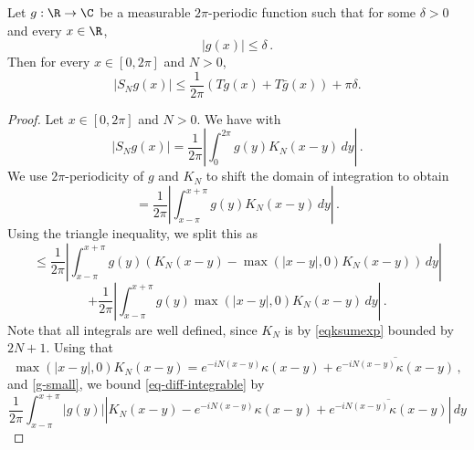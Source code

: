 \begin{lemma}
    \label{partial-Fourier-sum-bound}
    \leanok
    Let $g:\R\to\C$ be a measurable $2\pi$-periodic function such that for some $\delta>0$ and every $x\in\R$,
    \begin{equation}
        |g(x)|\le \delta \,.
    \end{equation}
    Then for every $x\in [0,2\pi]$ and $N>0$,
    \begin{equation*}
        |S_N g(x)| \le \frac{1}{2\pi} (Tg(x) + T\bar{g}(x)) + \pi\delta.
    \end{equation*}
\end{lemma}

\begin{proof}
    \leanok
    Let $x\in [0,2\pi]$ and $N>0$. We have with 
    \begin{equation*}
        |S_N g(x)| = \frac{1}{2\pi} \left| \int_0^{2\pi} g(y) K_N(x-y) \, dy\right|\,.
    \end{equation*}
    We use $2\pi$-periodicity of $g$ and $K_N$ to shift the domain of integration to obtain
    \begin{equation*}
        = \frac{1}{2\pi} \left|\int_{x-\pi}^{x+\pi} g(y) K_N(x-y) \, dy\right|\,.
    \end{equation*}
    Using the triangle inequality, we split this as
    \begin{equation}
        \label{eq-diff-integrable}
        \le \frac{1}{2\pi} \left|\int_{x-\pi}^{x+\pi} g(y) \left(K_N(x-y) - \max(|x-y|,0) K_N(x-y)\right) \, dy \right|
    \end{equation}
    \begin{equation}
        \label{eq-diff-singular}
        + \frac{1}{2\pi} \left|\int_{x-\pi}^{x+\pi} g(y) \max(|x-y|,0) K_N(x-y) \, dy\right|\,.
    \end{equation}
    Note that all integrals are well defined, since $K_N$ is by \eqref{eqksumexp} bounded by $2N+1$.
    Using that
    \begin{equation}
        \label{eq-Dirichlet-Hilbert}
        \max(|x-y|,0) K_N(x-y) = e^{-iN(x-y)}\kappa(x-y) + \overline{e^{-iN(x-y)}\kappa(x-y)} \,,
    \end{equation}
     and \eqref{g-small}, we bound \eqref{eq-diff-integrable} by
    \begin{equation*}
        \frac{1}{2\pi} \int_{x-\pi}^{x+\pi} |g(y)| \left|K_N(x-y) - e^{-iN(x-y)}\kappa(x-y) + \overline{e^{-iN(x-y)}\kappa(x-y)}\right|\, dy

\end{equation*}
\end{proof}
